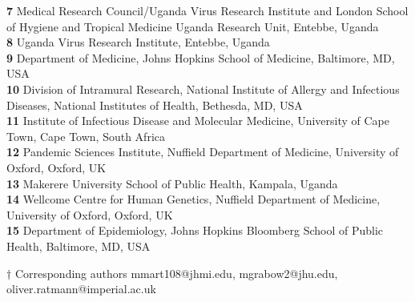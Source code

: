 \documentclass[10pt,letterpaper]{article}
\begin{document}
\begin{flushleft}
\textbf{7} Medical Research Council/Uganda Virus Research Institute and London School of Hygiene and Tropical Medicine Uganda Research Unit, Entebbe, Uganda \\

\textbf{8} Uganda Virus Research Institute, Entebbe, Uganda \\

\textbf{9} Department of Medicine, Johns Hopkins School of Medicine, Baltimore, MD, USA
\\
\textbf{10} Division of Intramural Research, National Institute of Allergy and Infectious Diseases, National Institutes of Health, Bethesda, MD, USA
\\
\textbf{11} Institute of Infectious Disease and Molecular Medicine, University of Cape Town, Cape Town, South Africa
\\
\textbf{12} Pandemic Sciences Institute, Nuffield Department of Medicine, University of Oxford, Oxford, UK \\

\textbf{13} Makerere University School of Public Health, Kampala, Uganda \\

\textbf{14} Wellcome Centre for Human Genetics, Nuffield Department of Medicine, University of Oxford, Oxford, UK \\

\textbf{15} Department of Epidemiology, Johns Hopkins Bloomberg School of Public Health, Baltimore, MD, USA \\

\bigskip

$\dagger$ Corresponding authors mmart108@jhmi.edu, mgrabow2@jhu.edu, oliver.ratmann@imperial.ac.uk 
\end{flushleft}

\end{document}
